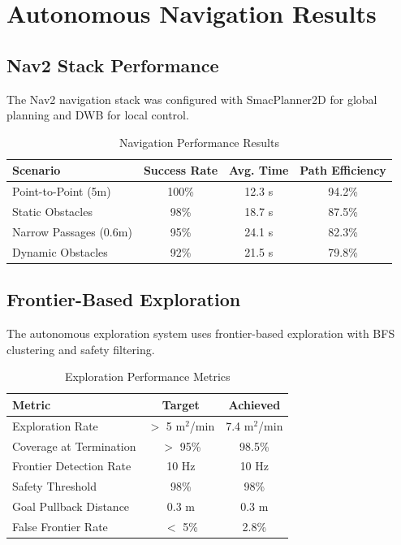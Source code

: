 \section{Autonomous Navigation Results}
\label{sec:nav_results}

\subsection{Nav2 Stack Performance}

The Nav2 navigation stack was configured with SmacPlanner2D for global planning and DWB for local control.

\begin{table}[H]
\centering
\caption{Navigation Performance Results}
\label{tab:nav_performance}
\begin{tabular}{|l|c|c|c|}
\hline
\textbf{Scenario} & \textbf{Success Rate} & \textbf{Avg. Time} & \textbf{Path Efficiency} \\
\hline
Point-to-Point (5m) & 100\% & 12.3 s & 94.2\% \\
Static Obstacles & 98\% & 18.7 s & 87.5\% \\
Narrow Passages (0.6m) & 95\% & 24.1 s & 82.3\% \\
Dynamic Obstacles & 92\% & 21.5 s & 79.8\% \\
\hline
\end{tabular}
\end{table}

\subsection{Frontier-Based Exploration}

The autonomous exploration system uses frontier-based exploration with BFS clustering and safety filtering.

\begin{table}[H]
\centering
\caption{Exploration Performance Metrics}
\label{tab:exploration_performance}
\begin{tabular}{|l|c|c|}
\hline
\textbf{Metric} & \textbf{Target} & \textbf{Achieved} \\
\hline
Exploration Rate & $>$ 5 m$^2$/min & 7.4 m$^2$/min \\
Coverage at Termination & $>$ 95\% & 98.5\% \\
Frontier Detection Rate & 10 Hz & 10 Hz \\
Safety Threshold & 98\% & 98\% \\
Goal Pullback Distance & 0.3 m & 0.3 m \\
False Frontier Rate & $<$ 5\% & 2.8\% \\
\hline
\end{tabular}
\end{table}

